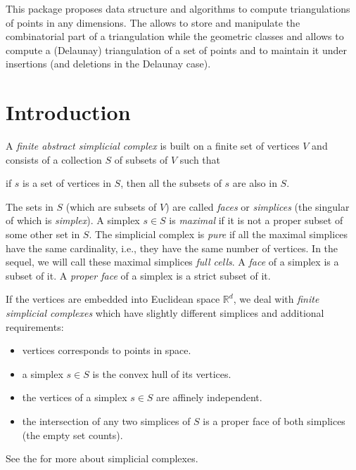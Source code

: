 
\newcommand{\note}[1]{\begin{ccTexOnly}%
{\color{red}$\langle\!\langle$#1$\rangle\!\rangle$}\end{ccTexOnly}}
\newcommand{\sphere}{\ensuremath{\mathcal S}}
\renewcommand{\real}{\ensuremath{\mathbb R}}

This package proposes data structure and algorithms to compute
triangulations of points in any dimensions.
The  allows to store and manipulate the
combinatorial part of a triangulation while the geometric classes
 and  allows to 
compute a (Delaunay) triangulation of a set of points and to maintain
it under insertions (and deletions in the Delaunay case).


\section{Introduction\label{triangulation:intro}}

A {\em finite abstract simplicial complex} is built on a finite set of
vertices $V$ and consists of a collection $S$ of subsets of $V$ such that

\centerline{if $s$ is a set of vertices in $S$, then all the subsets of $s$ are also
in $S$.}

The sets in $S$ (which are subsets of $V$) are called
{\em faces} or {\em simplices} (the
singular of which is {\em simplex}).
%
A simplex $s\in S$ is {\em maximal} if it is not a proper subset of some other
set in $S$. The simplicial complex is {\em pure} %
if all the maximal simplices have the same cardinality, i.e., they have the same
number of vertices. 
In the sequel, we will call these maximal simplices {\em full cells}.
A {\em face} of a simplex is a subset of it.
A {\em proper face} of a simplex is a strict subset of it.

If the vertices are embedded into Euclidean space $\real^d$, we deal with
{\em finite simplicial complexes} which have slightly different simplices
and additional requirements:
\begin{itemize}
\item vertices corresponds to points in space.
\item a simplex $s\in S$ is the convex hull of its vertices.
\item the vertices of a simplex $s\in S$ are affinely independent.
\item the intersection of any two simplices of $S$ is a proper face of both
simplices (the empty set counts).
\end{itemize}
See the  for more about simplicial complexes.

